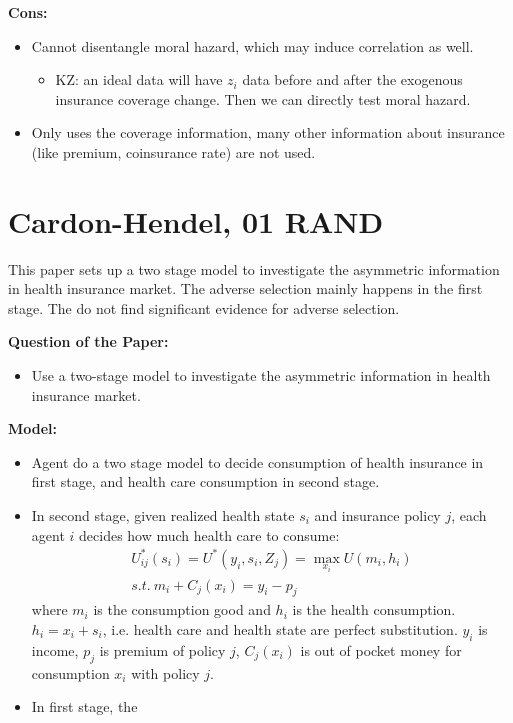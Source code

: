 \documentclass{book}
\theoremstyle{plain}
\theoremstyle{definition}
\begin{document}
\vspace{1em}
\noindent
\textbf{Cons:}
\begin{itemize}
	\item Cannot disentangle moral hazard, which may induce correlation as well.
	\begin{itemize}
		\item KZ: an ideal data will have $z_i$ data before and after the exogenous insurance coverage change. Then we can directly test moral hazard.
	\end{itemize}
	\item Only uses the coverage information, many other information about insurance (like premium, coinsurance rate) are not used.
\end{itemize}



\section{Cardon-Hendel, 01 RAND} %
\label{sec:cardon_hendel_01_rand}

\textbf{}

This paper sets up a two stage model to investigate the asymmetric information in health insurance market. The adverse selection mainly happens in the first stage.
The do not find significant evidence for adverse selection.

\vspace{1em}
\noindent
\textbf{Question of the Paper:}
\begin{itemize}
	\item Use a two-stage model to investigate the asymmetric information in health insurance market.
\end{itemize}

\vspace{1em}
\noindent
\textbf{Model:}
\begin{itemize}
	\item Agent do a two stage model to decide consumption of health insurance in first stage, and health care consumption in second stage.

	\item In second stage, given realized health state $s_i$ and  insurance policy $j$, each agent $i$ decides how much health care to consume:
	\begin{gather*}
	U_{ij}^*(s_i)=U^*(y_i,s_i,Z_j)=\max_{x_i}U(m_i,h_i)\\
	s.t.\  m_i+C_j(x_i)=y_i-p_j
	\end{gather*}
	where $m_i$ is the consumption good and $h_i$ is the health consumption. $h_i=x_i+s_i$, i.e. health care and health state are perfect substitution.
	$y_i$ is income, $p_j$ is premium of policy $j$, $C_j(x_i)$ is out of pocket money for consumption $x_i$ with policy $j$.

	\item In first stage, the 

\end{itemize}
\end{document}
